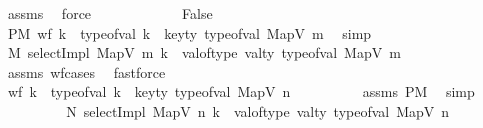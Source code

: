 \begin{isabellebody}
\ assms{\isacharparenleft}{\kern0pt}{}{\isacharparenright}{\kern0pt}\ \isamarkupfalse%
\ force\isanewline
\ \ \ \ \isamarkupfalse%
\isanewline
\ \ \ \ \ \ \isamarkupfalse%
\ False\isanewline
\ \ \ \ \ \ \isamarkupfalse%
\ \isamarkupfalse%
\ PM{\isacharcolon}{\kern0pt}\ {\isachardoublequoteopen}{\isacharparenleft}{\kern0pt}{\isasymnot}wf\ k\ {\isasymor}\ type{\isacharunderscore}{\kern0pt}of{\isacharunderscore}{\kern0pt}val\ k\ {\isasymnoteq}\ key{\isacharunderscore}{\kern0pt}ty\ {\isacharparenleft}{\kern0pt}type{\isacharunderscore}{\kern0pt}of{\isacharunderscore}{\kern0pt}val\ {\isacharparenleft}{\kern0pt}MapV\ m{\isacharparenright}{\kern0pt}{\isacharparenright}{\kern0pt}{\isacharparenright}{\kern0pt}{\isachardoublequoteclose}\ \isamarkupfalse%
\ simp\isanewline
\ \ \ \ \ \ \isamarkupfalse%
\ \isamarkupfalse%
\ M{\isacharcolon}{\kern0pt}\ {\isachardoublequoteopen}{\isacharparenleft}{\kern0pt}selectImpl\ {\isacharparenleft}{\kern0pt}MapV\ m{\isacharparenright}{\kern0pt}\ k{\isacharparenright}{\kern0pt}\ {\isacharequal}{\kern0pt}\ val{\isacharunderscore}{\kern0pt}of{\isacharunderscore}{\kern0pt}type\ {\isacharparenleft}{\kern0pt}val{\isacharunderscore}{\kern0pt}ty\ {\isacharparenleft}{\kern0pt}type{\isacharunderscore}{\kern0pt}of{\isacharunderscore}{\kern0pt}val\ {\isacharparenleft}{\kern0pt}MapV\ m{\isacharparenright}{\kern0pt}{\isacharparenright}{\kern0pt}{\isacharparenright}{\kern0pt}{\isachardoublequoteclose}\isanewline
\ \ \ \ \ \ \ \ \isamarkupfalse%
\ assms{\isacharparenleft}{\kern0pt}{}{\isacharparenright}{\kern0pt}\ wf{\isachardot}{\kern0pt}cases\ \isamarkupfalse%
\ fastforce\isanewline
\ \ \ \ \ \ \isamarkupfalse%
\ {\isachardoublequoteopen}{\isacharparenleft}{\kern0pt}{\isasymnot}wf\ k\ {\isasymor}\ type{\isacharunderscore}{\kern0pt}of{\isacharunderscore}{\kern0pt}val\ k\ {\isasymnoteq}\ key{\isacharunderscore}{\kern0pt}ty\ {\isacharparenleft}{\kern0pt}type{\isacharunderscore}{\kern0pt}of{\isacharunderscore}{\kern0pt}val\ {\isacharparenleft}{\kern0pt}MapV\ n{\isacharparenright}{\kern0pt}{\isacharparenright}{\kern0pt}{\isacharparenright}{\kern0pt}{\isachardoublequoteclose}\isanewline
\ \ \ \ \ \ \ \ \isamarkupfalse%
\ assms\ PM\ \isamarkupfalse%
\ simp\isanewline
\ \ \ \ \ \ \isamarkupfalse%
\ \isamarkupfalse%
\ N{\isacharcolon}{\kern0pt}\ {\isachardoublequoteopen}{\isacharparenleft}{\kern0pt}selectImpl\ {\isacharparenleft}{\kern0pt}MapV\ n{\isacharparenright}{\kern0pt}\ k{\isacharparenright}{\kern0pt}\ {\isacharequal}{\kern0pt}\ val{\isacharunderscore}{\kern0pt}of{\isacharunderscore}{\kern0pt}type\ {\isacharparenleft}{\kern0pt}val{\isacharunderscore}{\kern0pt}ty\ {\isacharparenleft}{\kern0pt}type{\isacharunderscore}{\kern0pt}of{\isacharunderscore}{\kern0pt}val\ {\isacharparenleft}{\kern0pt}MapV\ n{\isacharparenright}{\kern0pt}{\isacharparenright}{\kern0pt}{\isacharparenright}{\kern0pt}{\isachardoublequoteclose}\isanewline

\end{isabellebody}
